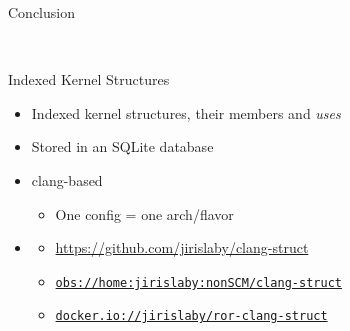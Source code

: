 \begin{frame}{Conclusion}

 \begin{center} \Huge
    \\[.6em]
 \end{center}

\end{frame}

\begin{frame}{}{Indexed Kernel Structures}

  \begin{center}
    \Large
  \end{center} 

  \vspace{1.5em}

  \begin{itemize}
    \item Indexed kernel structures, their members and \emph{uses}
    \item Stored in an SQLite database
    \item clang-based
      \begin{itemize}
	\item One config = one arch/flavor
      \end{itemize}
    \item {}
      \begin{itemize}
	\item \url{https://github.com/jirislaby/clang-struct}
	\item \href{https://build.opensuse.org/package/show/home:jirislaby:nonSCM/clang-struct}{\nolinkurl{obs://home:jirislaby:nonSCM/clang-struct}}
	\item \href{https://hub.docker.com/repository/docker/jirislaby/ror-clang-struct}{\nolinkurl{docker.io://jirislaby/ror-clang-struct}}
      \end{itemize}
  \end{itemize}

\end{frame}


